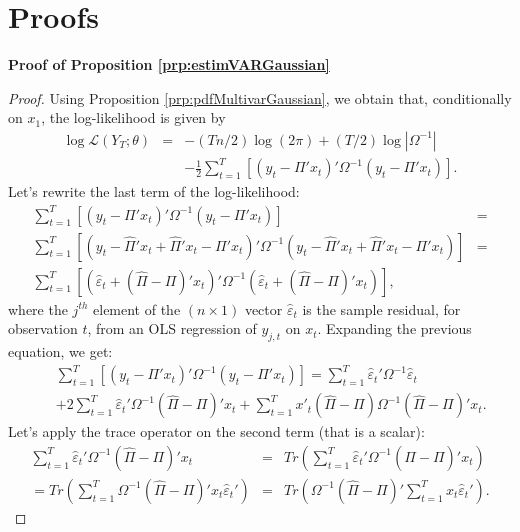 \documentclass[
  12pt,
]{book}
\theoremstyle{definition}
\theoremstyle{definition}
\theoremstyle{definition}
\theoremstyle{definition}
\theoremstyle{remark}
\begin{document}
\hypertarget{AppendixProof}{%
\section{Proofs}\label{AppendixProof}}

\textbf{Proof of Proposition \ref{prp:estimVARGaussian}}

\begin{proof}
Using Proposition \ref{prp:pdfMultivarGaussian}, we obtain that, conditionally on \(x_1\), the log-likelihood is given by
\begin{eqnarray*}
\log\mathcal{L}(Y_{T};\theta) & = & -(Tn/2)\log(2\pi)+(T/2)\log\left|\Omega^{-1}\right|\\
&  & -\frac{1}{2}\sum_{t=1}^{T}\left[\left(y_{t}-\Pi'x_{t}\right)'\Omega^{-1}\left(y_{t}-\Pi'x_{t}\right)\right].
\end{eqnarray*}
Let's rewrite the last term of the log-likelihood:
\begin{eqnarray*}
\sum_{t=1}^{T}\left[\left(y_{t}-\Pi'x_{t}\right)'\Omega^{-1}\left(y_{t}-\Pi'x_{t}\right)\right] & =\\
\sum_{t=1}^{T}\left[\left(y_{t}-\hat{\Pi}'x_{t}+\hat{\Pi}'x_{t}-\Pi'x_{t}\right)'\Omega^{-1}\left(y_{t}-\hat{\Pi}'x_{t}+\hat{\Pi}'x_{t}-\Pi'x_{t}\right)\right] & =\\
\sum_{t=1}^{T}\left[\left(\hat{\varepsilon}_{t}+(\hat{\Pi}-\Pi)'x_{t}\right)'\Omega^{-1}\left(\hat{\varepsilon}_{t}+(\hat{\Pi}-\Pi)'x_{t}\right)\right],
\end{eqnarray*}
where the \(j^{th}\) element of the \((n\times1)\) vector \(\hat{\varepsilon}_{t}\) is the sample residual, for observation \(t\), from an OLS regression of \(y_{j,t}\) on \(x_{t}\). Expanding the previous equation, we get:
\begin{eqnarray*}
&&\sum_{t=1}^{T}\left[\left(y_{t}-\Pi'x_{t}\right)'\Omega^{-1}\left(y_{t}-\Pi'x_{t}\right)\right]  = \sum_{t=1}^{T}\hat{\varepsilon}_{t}'\Omega^{-1}\hat{\varepsilon}_{t}\\
&&+2\sum_{t=1}^{T}\hat{\varepsilon}_{t}'\Omega^{-1}(\hat{\Pi}-\Pi)'x_{t}+\sum_{t=1}^{T}x'_{t}(\hat{\Pi}-\Pi)\Omega^{-1}(\hat{\Pi}-\Pi)'x_{t}.
\end{eqnarray*}
Let's apply the trace operator on the second term (that is a scalar):
\begin{eqnarray*}
\sum_{t=1}^{T}\hat{\varepsilon}_{t}'\Omega^{-1}(\hat{\Pi}-\Pi)'x_{t} & = & Tr\left(\sum_{t=1}^{T}\hat{\varepsilon}_{t}'\Omega^{-1}(\hat{\Pi}-\Pi)'x_{t}\right)\\
=  Tr\left(\sum_{t=1}^{T}\Omega^{-1}(\hat{\Pi}-\Pi)'x_{t}\hat{\varepsilon}_{t}'\right) & = & Tr\left(\Omega^{-1}(\hat{\Pi}-\Pi)'\sum_{t=1}^{T}x_{t}\hat{\varepsilon}_{t}'\right).

\end{eqnarray*}
\end{proof}
\end{document}
